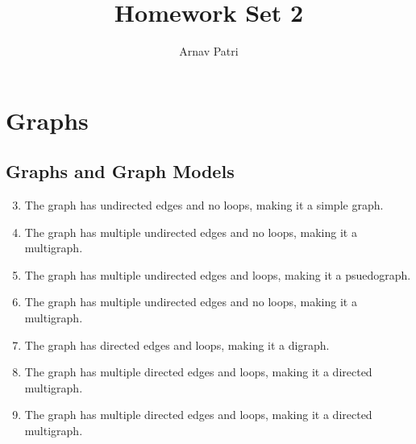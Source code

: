 \documentclass[12pt, A4]{article}
\title{Homework Set 2}
\author{Arnav Patri}
\date{}
\newcommand{\enumset}[1]{\setcounter{enumi}{#1}}
\begin{document}
	\maketitle
	\setcounter{section}{9}
	\section{Graphs}
		\subsection{Graphs and Graph Models}
			\begin{enumerate}
				\enumset{2}
				\item
					The graph has undirected edges and no loops, making it a simple graph.
				\item
					The graph has multiple undirected edges and no loops, making it a multigraph.
				\item
					The graph has multiple undirected edges and loops, making it a psuedograph.
				\item
					The graph has multiple undirected edges and no loops, making it a multigraph.
				\item
					The graph has directed edges and loops, making it a digraph.
				\item
					The graph has multiple directed edges and loops, making it a directed multigraph.
				\item
					The graph has multiple directed edges and loops, making it a directed multigraph.
			\end{enumerate}
\end{document}
